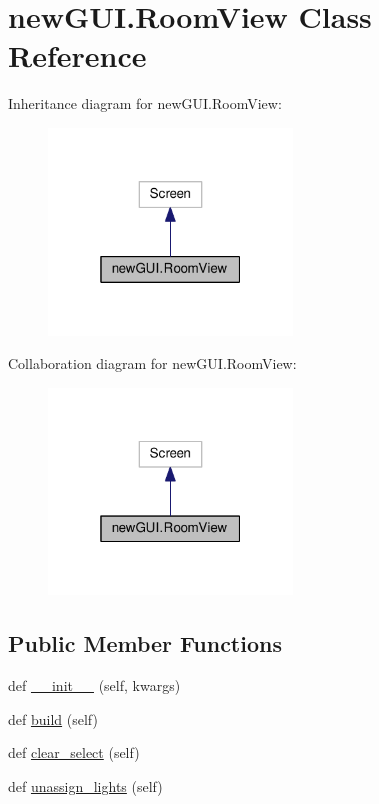 \hypertarget{classnewGUI_1_1RoomView}{}\section{new\+G\+U\+I.\+Room\+View Class Reference}
\label{classnewGUI_1_1RoomView}


Inheritance diagram for new\+G\+U\+I.\+Room\+View\+:
\nopagebreak
\begin{figure}[H]
\begin{center}
\leavevmode
\includegraphics[width=184pt]{classnewGUI_1_1RoomView__inherit__graph}
\end{center}
\end{figure}


Collaboration diagram for new\+G\+U\+I.\+Room\+View\+:
\nopagebreak
\begin{figure}[H]
\begin{center}
\leavevmode
\includegraphics[width=184pt]{classnewGUI_1_1RoomView__coll__graph}
\end{center}
\end{figure}
\subsection*{Public Member Functions}
\begin{DoxyCompactItemize}
\item 
def \hyperlink{classnewGUI_1_1RoomView_a6cd60b59cd9fb175ef78b2b54f1477aa}{\+\_\+\+\_\+init\+\_\+\+\_\+} (self, kwargs)
\item 
def \hyperlink{classnewGUI_1_1RoomView_a3ee7de067f3b07acf49aa981c9e24fec}{build} (self)
\item 
def \hyperlink{classnewGUI_1_1RoomView_a895aa2e014ce3d9459866012932f33b7}{clear\+\_\+select} (self)
\item 
def \hyperlink{classnewGUI_1_1RoomView_a2d470249b6ad5bd45e235896ed983f12}{unassign\+\_\+lights} (self)
\end{DoxyCompactItemize}
